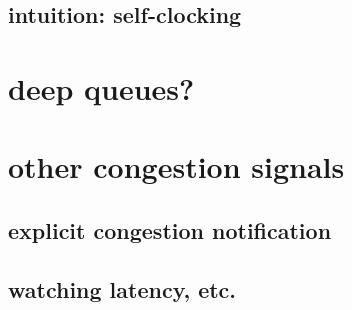 \subsection{intuition: self-clocking}



\section{deep queues?}


\section{other congestion signals}



\subsection{explicit congestion notification}


\subsection{watching latency, etc.}


